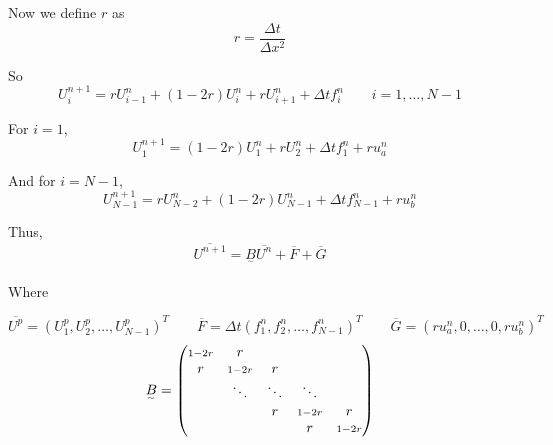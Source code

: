 Now we define $r$ as $$r = \frac{\Delta t}{\Delta x^2}$$

So $$U_i^{n+1} = rU_{i-1}^n + (1-2r)U_i^n + rU_{i+1}^n + \Delta t f_i^n \qquad i = 1,\ldots,N-1$$

For $i=1$, $$U_1^{n+1} = (1-2r)U_1^n + rU_2^n + \Delta t f_1^n + ru_a^n$$

And for $i=N-1$, $$U_{N-1}^{n+1} = rU_{N-2}^n + (1-2r)U_{N-1}^n + \Delta t f_{N-1}^n + ru_b^n$$

Thus, $$\overline{U^{n+1}} = \underset{^\sim}{B}\overline{U^n} + \overline{F} + \overline{G}$$

Where 

$$\overline{U^p} = \left(U_1^p, U_2^p, \ldots , U_{N-1}^p \right)^T \qquad \overline{F}=\Delta t\left(f_1^n, f_2^n, \ldots,f_{N-1}^n \right)^T \qquad \overline{G} = \left(ru_a^n, 0, \ldots,0,ru_b^n \right)^T$$
$$
  \underset{^\sim}{B} = 
  \begin{pmatrix}
    \scriptstyle\small{1-2r} & r \\
    r    & \scriptstyle\small{1-2r} & r \\
         & \ddots & \ddots & \ddots \\
         &        & r & \scriptstyle\small{1-2r} & r \\
         &        &   & r    & \scriptstyle\small{1-2r}
  \end{pmatrix}
$$
